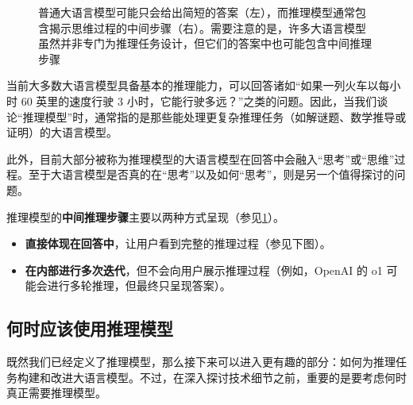 \documentclass[lang=cn,newtx,10pt,scheme=chinese]{elegantbook}
\begin{document}
\begin{figure}[!ht]
\centering
{}%
\caption{普通大语言模型可能只会给出简短的答案（左），而推理模型通常包含揭示思维过程的中间步骤（右）。需要注意的是，许多大语言模型虽然并非专门为推理任务设计，但它们的答案中也可能包含中间推理步骤}
\label{fig:llm-reasoning}
\end{figure}

当前大多数大语言模型具备基本的推理能力，可以回答诸如``如果一列火车以每小时 60 英里的速度行驶 3 小时，它能行驶多远？''之类的问题。因此，当我们谈论``推理模型''时，通常指的是那些能处理更复杂推理任务（如解谜题、数学推导或证明）的大语言模型。

此外，目前大部分被称为推理模型的大语言模型在回答中会融入``思考''或``思维''过程。至于大语言模型是否真的在``思考''以及如何``思考''，则是另一个值得探讨的问题。

推理模型的\textbf{中间推理步骤}主要以两种方式呈现（参见\ref{fig:llm-reasoning}）。

\begin{itemize}
\item \textbf{直接体现在回答中}，让用户看到完整的推理过程（参见下图）。
\item \textbf{在内部进行多次迭代}，但不会向用户展示推理过程（例如，OpenAI 的 o1 可能会进行多轮推理，但最终只呈现答案）。
\end{itemize}

\subsection{何时应该使用推理模型}

既然我们已经定义了推理模型，那么接下来可以进入更有趣的部分：如何为推理任务构建和改进大语言模型。不过，在深入探讨技术细节之前，重要的是要考虑何时真正需要推理模型。
\end{document}

